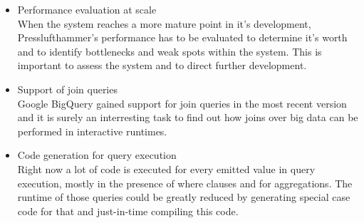\begin{itemize}
    \item Performance evaluation at scale\\
      When the system reaches a more mature point in it's development,
      Presslufthammer's performance has to be evaluated to determine it's worth
      and to identify bottlenecks and weak spots within the system. This is
      important to assess the system and to direct further development.

    \item Support of join queries\\
      Google BigQuery gained support for join queries in the most recent
      version and it is surely an interresting task to find out how
      joins over big data can be performed in interactive runtimes.
    
    \item Code generation for query execution\\
      Right now a lot of code is executed for every emitted value in
      query execution, mostly in the presence of where clauses and for
      aggregations. The runtime of those queries could be greatly
      reduced by generating special case code for that and just-in-time
      compiling this code.
    
  \end{itemize}


